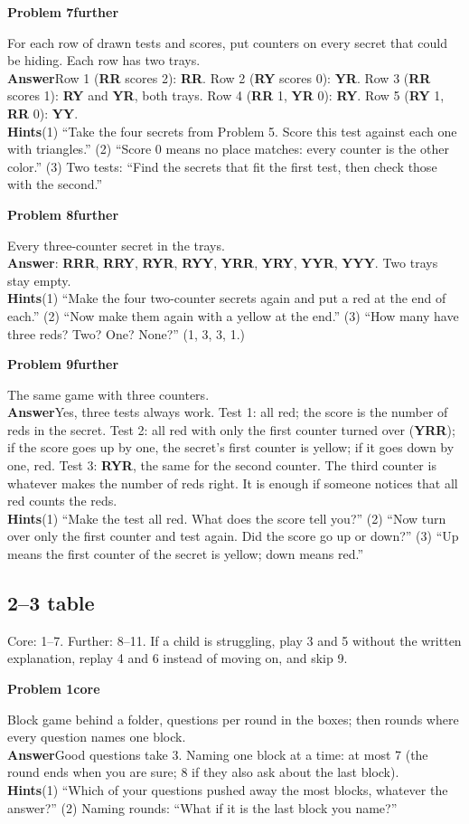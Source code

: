 \documentclass[11pt]{article}
\newcommand{\cd}[1]{\mbox{\textsf{\textbf{#1}}}}   %
\newcommand{\core}{\textcolor{tagcore}{\textbf{core}}}
\newcommand{\further}{\textcolor{tagmore}{\textbf{further}}}
\newcommand{\pb}[3]{\par\needspace{5\baselineskip}\medskip\textbf{Problem #1}\enspace{\small page #2}\enspace\textperiodcentered\enspace #3\par\nopagebreak}
\newcommand{\lab}[1]{\textbf{#1}\enspace}
\newcommand{\hints}[1]{\lab{Hints}#1}
\begin{document}
\pb{7}{5}{\further}
For each row of drawn tests and scores, put counters on every secret that could be hiding. Each row has two trays.\\
\lab{Answer}Row 1 (\cd{RR} scores 2): \cd{RR}. Row 2 (\cd{RY} scores 0): \cd{YR}. Row 3 (\cd{RR} scores 1): \cd{RY} and \cd{YR}, both trays. Row 4 (\cd{RR} 1, \cd{YR} 0): \cd{RY}. Row 5 (\cd{RY} 1, \cd{RR} 0): \cd{YY}.\\
\hints{(1) ``Take the four secrets from Problem 5. Score this test against each one with triangles.'' (2) ``Score 0 means no place matches: every counter is the other color.'' (3) Two tests: ``Find the secrets that fit the first test, then check those with the second.''}

\pb{8}{6}{\further}
Every three-counter secret in the trays.\\
\lab{Answer}8: \cd{RRR}, \cd{RRY}, \cd{RYR}, \cd{RYY}, \cd{YRR}, \cd{YRY}, \cd{YYR}, \cd{YYY}. Two trays stay empty.\\
\hints{(1) ``Make the four two-counter secrets again and put a red at the end of each.'' (2) ``Now make them again with a yellow at the end.'' (3) ``How many have three reds? Two? One? None?'' (1, 3, 3, 1.)}

\pb{9}{7}{\further}
The same game with three counters.\\
\lab{Answer}Yes, three tests always work. Test 1: all red; the score is the number of reds in the secret. Test 2: all red with only the first counter turned over (\cd{YRR}); if the score goes up by one, the secret's first counter is yellow; if it goes down by one, red. Test 3: \cd{RYR}, the same for the second counter. The third counter is whatever makes the number of reds right. It is enough if someone notices that all red counts the reds.\\
\hints{(1) ``Make the test all red. What does the score tell you?'' (2) ``Now turn over only the first counter and test again. Did the score go up or down?'' (3) ``Up means the first counter of the secret is yellow; down means red.''}

\subsection{2--3 table}
Core: 1--7. Further: 8--11. If a child is struggling, play 3 and 5 without the written explanation, replay 4 and 6 instead of moving on, and skip 9.

\pb{1}{1}{\core}
Block game behind a folder, questions per round in the boxes; then rounds where every question names one block.\\
\lab{Answer}Good questions take 3. Naming one block at a time: at most 7 (the round ends when you are sure; 8 if they also ask about the last block).\\
\hints{(1) ``Which of your questions pushed away the most blocks, whatever the answer?'' (2) Naming rounds: ``What if it is the last block you name?''}
\end{document}
